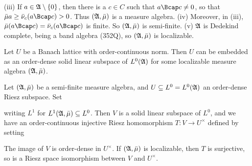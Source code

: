 {
     
\noindent (iii) If $a\in\frak A\setminus\{0\}$, then there is a $c\in C$
such that $a\Bcap c\ne 0$, so that $\bar\mu a\ge\bar\nu_c(a\Bcap c)>0$.
Thus $(\frak A,\bar\mu)$ is a measure algebra.   (iv) Moreover, in
(iii), $\bar\mu(a\Bcap c)=\bar\nu_c(a\Bcap c)$ is finite.   So $(\frak
A,\bar\mu)$ is semi-finite.   (v) $\frak A$ is Dedekind complete, being
a band algebra (352Q), so $(\frak A,\bar\mu)$ is localizable.\ \Qed
}%
     
 Let $U$ be a Banach lattice with
order-continuous norm.   Then $U$ can be embedded as an order-dense
solid linear subspace of $L^0(\frak A)$ for some localizable measure
algebra $(\frak A,\bar\mu)$.
     
     
 Let $(\frak A,\bar\mu)$ be a semi-finite measure
algebra, and $U\subseteq L^0=L^0(\frak A)$ an order-dense Riesz
subspace.   Set
     
     
\noindent writing $L^1$ for $L^1(\frak A,\bar\mu)\subseteq L^0$.   Then
$V$ is a solid linear subspace of $L^0$, and we have an order-continuous
injective Riesz homomorphism $T:V\to U^{\times}$ defined by setting
     
     
\noindent The image of $V$ is order-dense in $U^{\times}$.   If 
$(\frak A,\bar\mu)$ is localizable, then $T$ is surjective, so is a Riesz space isomorphism between $V$ and $U^{\times}$.
     
